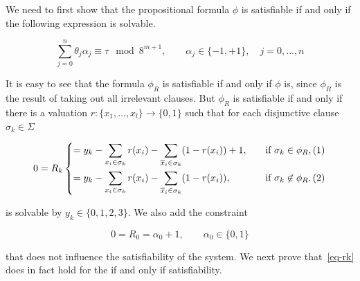 \documentclass{amsart}
\newcommand{\ov}{\overline}
\theoremstyle{plain}
\numberwithin{equation}{section}
\begin{document}
We need to first show that the propositional formula $\phi$ is satisfiable if and only if the
following expression is solvable.

\begin{equation*}
  \sum_{j=0}^n \theta_j\alpha_j\equiv\tau\mod 8^{m+1},\qquad\alpha_j\in\{-1,+1\},\quad j=0,\ldots,n
\end{equation*}

It is easy to see that the formula $\phi_R$ is satisfiable if and only if $\phi$ is, since $\phi_R$
is the result of taking out all irrelevant clauses. But $\phi_R$ is satisfiable if and only if
there is a valuation $r:\{x_1,\ldots,x_l\}\to\{0,1\}$ such that for each disjunctive clause
$\sigma_k\in\Sigma$

\begin{equation}\label{eq-rk}
  0 = R_k
  \begin{dcases}
    =y_k-\sum_{x_i\in\sigma_k} r(x_i)-\sum_{\ov{x}_i\in\sigma_k} (1-r(x_i))+1, \quad&\text{if }
    \sigma_k\in\phi_R,\hfill(1)\\
    =y_k-\sum_{x_i\in\sigma_k} r(x_i)-\sum_{\ov{x}_i\in\sigma_k} (1-r(x_i)), \quad&\text{if }
    \sigma_k\not\in\phi_R.\hfill(2)
  \end{dcases}
\end{equation}

is solvable by $y_k\in\{0,1,2,3\}$. We also add the constraint

\begin{equation*}
  0 = R_0 = \alpha_0 + 1, \qquad \alpha_0\in\{0, 1\}
\end{equation*}

that does not influence the satisfiability of the system. We next prove that~\autoref{eq-rk} does
in fact hold for the if and only if satisfiability.
\end{document}
